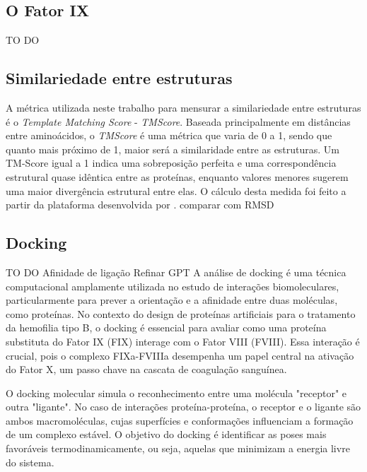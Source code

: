 \subsection{O Fator IX}
{\color{red} TO DO}


\subsection{Similariedade entre estruturas}
\label{subsection:tmscore}
A métrica utilizada neste trabalho para mensurar a similariedade entre estruturas é o \textit{Template Matching Score} - \textit{TMScore}. 
Baseada principalmente em distâncias entre aminoácidos, o \textit{TMScore} é uma métrica que varia de 0 a 1,
sendo que quanto mais próximo de 1, maior será a similaridade entre as estruturas. 
Um TM-Score igual a 1 indica uma sobreposição perfeita e uma correspondência estrutural quase idêntica entre as proteínas, 
enquanto valores menores sugerem uma maior divergência estrutural entre elas. 
O cálculo desta medida foi feito a partir da plataforma desenvolvida por \cite{USalign}.
{\color{red} comparar com RMSD }


\subsection{Docking}
{\color{red} TO DO}
{\color{red} Afinidade de ligação}
{\color{red} Refinar GPT}
A análise de docking é uma técnica computacional amplamente utilizada no estudo de interações biomoleculares,
particularmente para prever a orientação e a afinidade entre duas moléculas,
como proteínas. 
No contexto do design de proteínas artificiais para o tratamento da hemofilia tipo B,
o docking é essencial para avaliar como uma proteína substituta do Fator IX (FIX) interage com o Fator VIII (FVIII). 
Essa interação é crucial, pois o complexo FIXa-FVIIIa desempenha um papel central na ativação do Fator X,
um passo chave na cascata de coagulação sanguínea.

O docking molecular simula o reconhecimento entre uma molécula "receptor" e outra "ligante". 
No caso de interações proteína-proteína, o receptor e o ligante são ambos macromoléculas,
cujas superfícies e conformações influenciam a formação de um complexo estável.
O objetivo do docking é identificar as poses mais favoráveis termodinamicamente, ou seja, 
aquelas que minimizam a energia livre do sistema.

